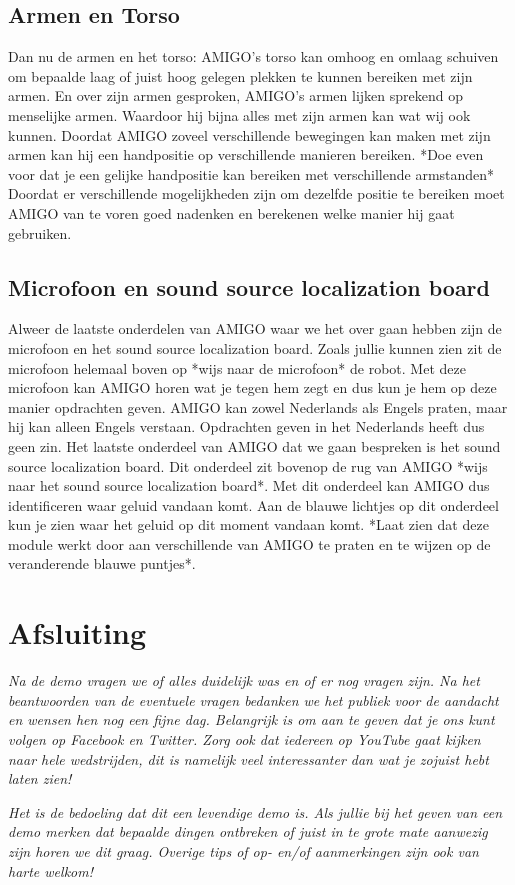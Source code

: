 \documentclass[a4paper,10pt]{article}
\numberwithin{equation}{section}
\numberwithin{figure}{section}
\numberwithin{table}{section}
\begin{document}
\subsection*{Armen en Torso}
Dan nu de armen en het torso: AMIGO's torso kan omhoog en omlaag schuiven om bepaalde laag of juist hoog gelegen plekken te kunnen bereiken met zijn armen. En over zijn armen gesproken, AMIGO's armen lijken sprekend op menselijke armen. Waardoor hij bijna alles met zijn armen kan wat wij ook kunnen. Doordat AMIGO zoveel verschillende bewegingen kan maken met zijn armen kan hij een handpositie op verschillende manieren bereiken. *Doe even voor dat je een gelijke handpositie kan bereiken met verschillende armstanden* Doordat er verschillende mogelijkheden zijn om dezelfde positie te bereiken moet AMIGO van te voren goed nadenken en berekenen welke manier hij gaat gebruiken.
 
\subsection*{Microfoon en sound source localization board} 
Alweer de laatste onderdelen van AMIGO waar we het over gaan hebben zijn de microfoon en het sound source localization board. Zoals jullie kunnen zien zit de microfoon helemaal boven op *wijs naar de microfoon* de robot. Met deze microfoon kan AMIGO horen wat je tegen hem zegt en dus kun je hem op deze manier opdrachten geven.  AMIGO kan zowel Nederlands als Engels praten, maar hij kan alleen Engels verstaan. Opdrachten geven in het Nederlands heeft dus geen zin. Het laatste onderdeel van AMIGO dat we gaan bespreken is het sound source localization board. Dit onderdeel zit bovenop de rug van AMIGO *wijs naar het sound source localization board*. Met dit onderdeel kan AMIGO dus identificeren waar geluid vandaan komt. Aan de blauwe lichtjes op dit onderdeel kun je zien waar het geluid op dit moment vandaan komt. *Laat zien dat deze module werkt door aan verschillende van AMIGO te praten en te wijzen op de veranderende blauwe puntjes*. 

\section*{Afsluiting}
\textit{Na de demo vragen we of alles duidelijk was en of er nog vragen zijn. Na het beantwoorden van de eventuele vragen bedanken we het publiek voor de aandacht en wensen hen nog een fijne dag. Belangrijk is om aan te geven dat je ons kunt volgen op Facebook en Twitter. Zorg ook dat iedereen op YouTube gaat kijken naar hele wedstrijden, dit is namelijk veel interessanter dan wat je zojuist hebt laten zien!}

\textit{Het is de bedoeling dat dit een levendige demo is. Als jullie bij het geven van een demo merken dat bepaalde dingen ontbreken of juist in te grote mate aanwezig zijn horen we dit graag. Overige tips of op- en/of aanmerkingen zijn ook van harte welkom! }
\end{document}
